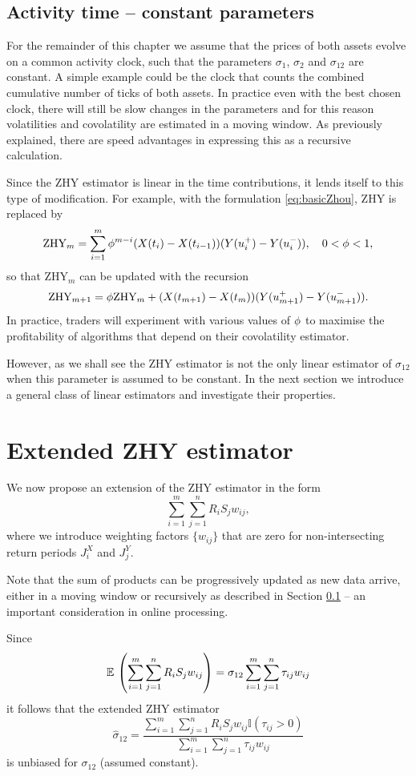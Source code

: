 \subsection{Activity time -- constant parameters}\label{sec:HYrecursion}
For the remainder of this chapter we assume that the prices of both assets evolve on a common activity clock, such that the parameters $\sigma_1$, $\sigma_2$ and $\sigma_{12}$ are constant. A simple example could be the clock that counts the combined cumulative number of ticks of both assets.  In practice even with the best chosen clock, there will still be slow changes in the parameters and for this reason volatilities and covolatility are estimated in a moving window. As previously explained, there are speed advantages in expressing this as a recursive calculation.  

Since the ZHY estimator is linear in the time contributions, it lends itself to this type of modification.  For example, with the formulation \eqref{eq:basicZhou}, ZHY is replaced by
$$\text{ZHY}_m = \sum_{i=1}^{m} \phi^{m-i} (X(t_i) - X(t_{i-1}))(Y(u^+_i) - Y(u^-_i)), \quad 0 < \phi <1,$$  
so that $\text{ZHY}_m$ can be updated with the recursion
$$ \text{ZHY}_{m+1} = \phi \text{ZHY}_m + (X(t_{m+1}) - X(t_{m}))(Y(u^+_{m+1}) - Y(u^-_{m+1})).$$ 
In practice, traders will experiment with various values of $\phi$ to maximise the profitability of algorithms that depend on their covolatility estimator.

However, as we shall see the ZHY estimator is not the only linear estimator of $\sigma_{12}$ when this parameter is assumed to be constant. In the next section we introduce a general class of linear estimators and investigate their properties.      


\section{Extended ZHY estimator}\label{sec:extZHY}
We now propose an extension of the ZHY estimator in the form 
$$\sum_{i=1}^m \sum_{j=1}^n R_i S_j w_{ij} ,$$
where we introduce weighting factors $\{w_{ij}\}$ that are zero for non-intersecting return periods $J^X_i$ and $J^Y_j$. 

Note that the sum of products can be progressively updated as new data arrive, either in a moving window or recursively as described in Section \ref{sec:HYrecursion} -- an important consideration in online processing. 

Since 
$$ \mathbb{E}\,\left(\sum_{i=1}^{m} \sum_{j=1}^{n} R_i S_j w_{ij}\right) = \sigma_{12} \sum_{i=1}^m \sum_{j=1}^n \tau_{ij} w_{ij}$$
it follows that the extended ZHY estimator  
\begin{equation}\label{eq:extendedZHY} 
\hat{\sigma}_{12} = \frac{\sum_{i=1}^{m}\sum_{j=1}^{n} R_i S_j w_{ij}\mathbb{I}(\tau_{ij} >0)}{\sum_{i=1}^{m} \sum_{j=1}^{n} \tau_{ij} w_{ij}}
\end{equation}
is unbiased for $\sigma_{12}$ (assumed constant).

